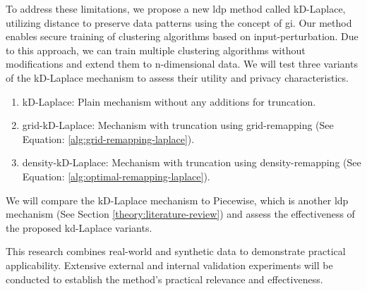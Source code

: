 To address these limitations, we propose a new \gls{ldp} method called kD-Laplace, utilizing distance to preserve data patterns using the concept of \gls{gi}. \newline
Our method enables secure training of clustering algorithms based on input-perturbation.
Due to this approach, we can train multiple clustering algorithms without modifications and extend them to n-dimensional data.
We will test three variants of the kD-Laplace mechanism to assess their utility and privacy characteristics.
\begin{enumerate}
      \item kD-Laplace: Plain mechanism without any additions for truncation.
      \item grid-kD-Laplace: Mechanism with truncation using grid-remapping (See Equation: \ref{alg:grid-remapping-laplace}).
      \item density-kD-Laplace: Mechanism with truncation using density-remapping (See Equation: \ref{alg:optimal-remapping-laplace}).
\end{enumerate}
We will compare the kD-Laplace mechanism to Piecewise, which is another \gls{ldp} mechanism (See Section \ref{theory:literature-review}) and assess the effectiveness of the proposed kd-Laplace variants.

This research combines real-world and synthetic data to demonstrate practical applicability.
Extensive external and internal validation experiments will be conducted to establish the method's practical relevance and effectiveness.


